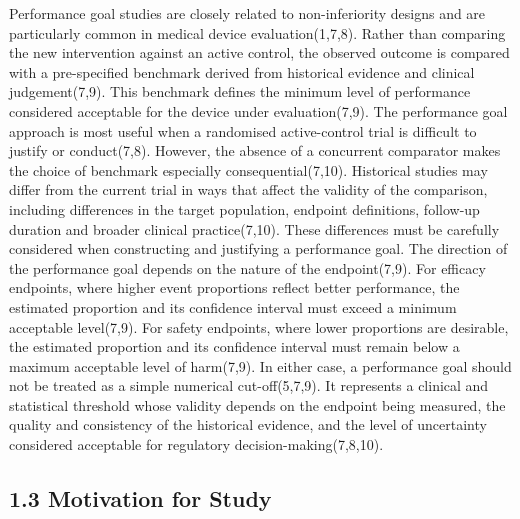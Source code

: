 \documentclass{article}
\begin{document}
Performance goal studies are closely related to non-inferiority designs
and are particularly common in medical device evaluation(1,7,8). Rather
than comparing the new intervention against an active control, the
observed outcome is compared with a pre-specified benchmark derived from
historical evidence and clinical judgement(7,9). This benchmark defines
the minimum level of performance considered acceptable for the device
under evaluation(7,9). The performance goal approach is most useful when
a randomised active-control trial is difficult to justify or
conduct(7,8). However, the absence of a concurrent comparator makes the
choice of benchmark especially consequential(7,10). Historical studies
may differ from the current trial in ways that affect the validity of
the comparison, including differences in the target population, endpoint
definitions, follow-up duration and broader clinical practice(7,10).
These differences must be carefully considered when constructing and
justifying a performance goal. The direction of the performance goal
depends on the nature of the endpoint(7,9). For efficacy endpoints,
where higher event proportions reflect better performance, the estimated
proportion and its confidence interval must exceed a minimum acceptable
level(7,9). For safety endpoints, where lower proportions are desirable,
the estimated proportion and its confidence interval must remain below a
maximum acceptable level of harm(7,9). In either case, a performance
goal should not be treated as a simple numerical cut-off(5,7,9). It
represents a clinical and statistical threshold whose validity depends
on the endpoint being measured, the quality and consistency of the
historical evidence, and the level of uncertainty considered acceptable
for regulatory decision-making(7,8,10).

\subsection{1.3 Motivation for Study}\label{motivation-for-study}
\end{document}

